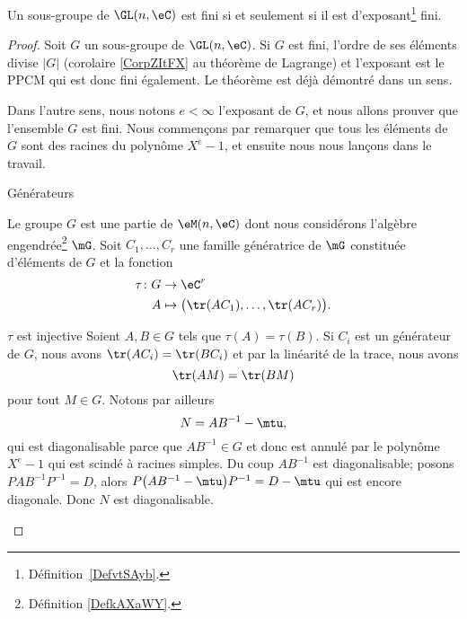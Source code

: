 \begin{theorem}\label{ThooJLTit}
    Un sous-groupe de \( \GL(n,\eC)\) est fini si et seulement si il est d'exposant\footnote{Définition~\ref{DefvtSAyb}.} fini.
\end{theorem}

\begin{proof}
    Soit \( G\) un sous-groupe de \( \GL(n,\eC)\). Si \( G\) est fini, l'ordre de ses éléments divise \( | G |\) (corolaire \ref{CorpZItFX} au théorème de Lagrange) et l'exposant est le PPCM qui est donc fini également. Le théorème est déjà démontré dans un sens.

    Dans l'autre sens, nous notons \( e<\infty\) l'exposant de \( G\), et nous allons prouver que l'ensemble \( G\) est fini. Nous commençons par remarquer que tous les éléments de \( G\) sont des racines du polynôme \( X^e-1\), et ensuite nous nous lançons dans le travail.

    \begin{subproof}
        \item[Générateurs]

            Le groupe \( G\) est une partie de \( \eM(n,\eC)\) dont nous considérons l'algèbre engendrée\footnote{Définition \ref{DefkAXaWY}.} \( \mG\). Soit \( C_1,\ldots, C_r\) une famille génératrice de \( \mG\) constituée d'éléments de \( G\) et la fonction
            \begin{equation}
                \begin{aligned}
                    \tau\colon G&\to \eC^r \\
                    A&\mapsto \big( \tr(AC_1),\ldots, \tr(AC_r) \big).
                \end{aligned}
            \end{equation}

        \item[\( \tau\) est injective] Soient \( A,B\in G\) tels que \( \tau(A)=\tau(B)\). Si \( C_i\) est un générateur de \( G\), nous avons \( \tr(AC_i)=\tr(BC_i)\) et par la linéarité de la trace, nous avons
            \begin{equation}    \label{EqnCYmKW}
                \tr(AM)=\tr(BM)
            \end{equation}
            pour tout \( M\in G\). Notons par ailleurs
            \begin{equation}
                N=AB^{-1}-\mtu,
            \end{equation}
            qui est diagonalisable parce que \( AB^{-1}\in G\) et donc est annulé par le polynôme \( X^e-1\) qui est scindé à racines simples. Du coup \( AB^{-1}\) est diagonalisable; posons \( PAB^{-1}P^{-1}=D\), alors \( P\big( AB^{-1}-\mtu \big)P^{-1}=D-\mtu\) qui est encore diagonale. Donc \( N\) est diagonalisable.


\end{subproof}
\end{proof}
